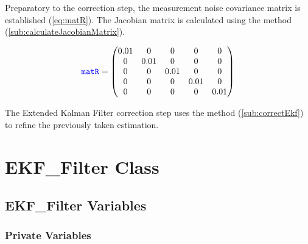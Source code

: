 Preparatory to the correction step, the measurement noise covariance matrix  is established (\ref{eq:matR}). The Jacobian matrix  is calculated using the  method (\ref{sub:calculateJacobianMatrix}).

\begin{equation}
	\begin{centering}
		\blueconsolas{matR} =
		\begin{pmatrix}
			0.01 & 0 & 0 & 0 & 0 \\
			0 & 0.01 & 0 & 0 & 0 \\
			0 & 0 & 0.01 & 0 & 0 \\
			0 & 0 & 0 & 0.01 & 0 \\
			0 & 0 & 0 & 0 & 0.01 \\
		\end{pmatrix}
	\end{centering}
	\label{eq:matR}
\end{equation}

The Extended Kalman Filter correction step uses the  method (\ref{sub:correctEkf}) to refine the previously taken estimation. 

\section{EKF\_Filter Class}
\label{sec:EKF_Filter Class}

\subsection{EKF\_Filter Variables}
\label{sub:EKF_Filter_Variables}

\subsubsection{Private Variables}

